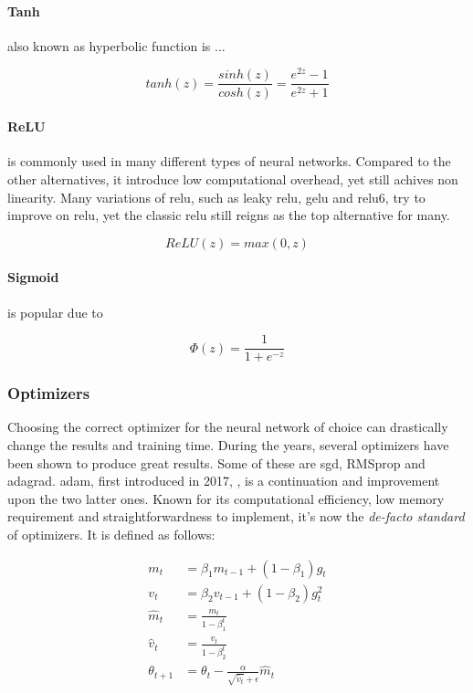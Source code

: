 \paragraph{Tanh} also known as hyperbolic function is ...

\begin{equation}
    tanh(z) = \dfrac{sinh(z)}{cosh(z)} = \dfrac{e^{2z} - 1}{e^{2z} + 1}
\label{eq:tanh}
\end{equation}

\paragraph{ReLU} is commonly used in many different types of neural networks. Compared to the other alternatives, it introduce low computational overhead, yet still achives non linearity. Many variations of relu, such as leaky relu, gelu and relu6, try to improve on relu, yet the classic relu still reigns as the top alternative for many.

\begin{equation}
    ReLU(z) = max(0, z)
\label{eq:relu}
\end{equation}

\paragraph{Sigmoid} is popular due to 

\begin{equation}
    \Phi(z) = \dfrac{1}{1 + e^{-z}}
\label{eq:sigmoid}
\end{equation}

\subsubsection{Optimizers}

Choosing the correct optimizer for the neural network of choice can drastically change the results and training time. During the years, several optimizers have been shown to produce great results. Some of these are \acrfull{sgd}, RMSprop and \acrfull{adagrad}. \acrfull{adam}, first introduced in 2017, \cite{kingma2017adam}, is a continuation and improvement upon the two latter ones. Known for its computational efficiency, low memory requirement and straightforwardness to implement, it's now the \textit{de-facto standard} of optimizers. It is defined as follows:


\begin{align}
    m_t &= \beta_1 m_{t-1} + (1 - \beta_1) g_t \\
    v_t &= \beta_2 v_{t-1} + (1 - \beta_2) g_t^2 \\
    \hat{m}_t &= \frac{m_t}{1 - \beta_1^t} \\
    \hat{v}_t &= \frac{v_t}{1 - \beta_2^t} \\
    \theta_{t+1} &= \theta_t - \frac{\alpha}{\sqrt{\hat{v}_t} + \epsilon} \hat{m}_t
\end{align}

